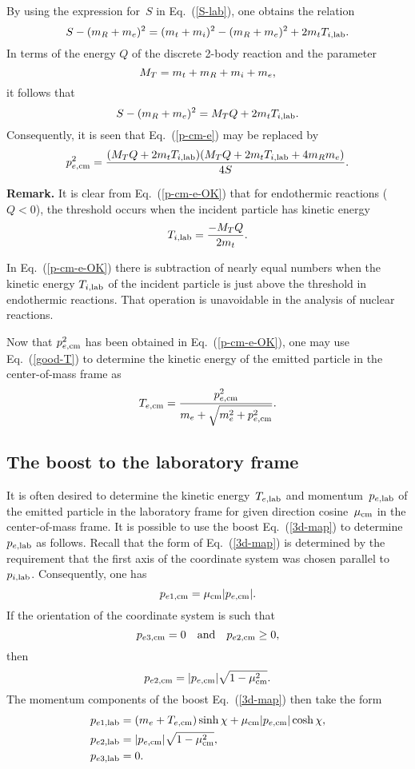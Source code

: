 {By using the expression for~$S$ in Eq.~(\ref{S-lab}), one
obtains the relation
$$
  S - (m_R + m_e)^2 =
  (m_t + m_i)^2 - (m_R + m_e)^2  + 2m_t T_{i,\textrm{lab}}.
$$
In terms of the energy $Q$ of the discrete 2-body reaction
and the parameter
\begin{equation}
  M_T = m_t + m_R + m_i + m_e,
 \label{def-M}
\end{equation}
it follows that
$$
    S - (m_R + m_e)^2 =
     M_T Q + 2m_t T_{i,\textrm{lab}}.
$$
Consequently, it is seen that Eq.~(\ref{p-cm-e}) may be
replaced by
\begin{equation}
  p_{e,\textrm{cm}}^2 = \frac{ (M_T Q +  2m_t T_{i,\textrm{lab}} )
                 ( M_T Q +  2m_t T_{i,\textrm{lab}} + 4m_R m_e)}
                {4 S }.
  \label{p-cm-e-OK}
\end{equation}

\textbf{Remark.}
It is clear from Eq.~(\ref{p-cm-e-OK}) that for endothermic
reactions ($Q < 0$), the threshold occurs when the incident
particle has kinetic energy
$$
  T_{i,\textrm{lab}} = \frac{-M_T Q}{2m_t}.
$$

In Eq.~(\ref{p-cm-e-OK}) there is subtraction of nearly equal
numbers when the kinetic energy $T_{i,\textrm{lab}}$ of the incident
particle is just above the threshold in endothermic reactions.
That operation is unavoidable in
the analysis of nuclear reactions. 

Now that $p_{e,\textrm{cm}}^2$ has been obtained in Eq.~(\ref{p-cm-e-OK}), one may use
Eq.~(\ref{good-T}) to determine the kinetic energy of the
emitted particle in the center-of-mass frame as
\begin{equation}
  T_{e,\textrm{cm}} = \frac{p_{e,\textrm{cm}}^2 }
          {m_e + \sqrt{ m_e^2 + p_{e,\textrm{cm}}^2 }}.
 \label{T-cm-e}
\end{equation}

\subsection{The boost to the laboratory frame}
It is often desired to determine the kinetic energy~$T_{e,\textrm{lab}}$
and momentum~$p_{e,\textrm{lab}}$ of the emitted particle in the laboratory frame
for given direction cosine~$\mu_{\text{cm}}$ in the center-of-mass frame.
It is possible to use the boost 
Eq.~(\ref{3d-map}) to determine $p_{e,\textrm{lab}}$ as follows.  Recall that
the form of Eq.~(\ref{3d-map}) is determined by the requirement that
the first axis of the coordinate system was chosen parallel to~$p_{i,\textrm{lab}}$.
Consequently, one has
$$
  p_{e1,\textrm{cm}} = \mu_{\text{cm}} |p_{e,\textrm{cm}}|.
$$
If the orientation of the coordinate system is such that
$$
  p_{e3,\textrm{cm}} = 0
  \quad \textrm{and} \quad
  p_{e2,\textrm{cm}} \ge 0,
$$
then
$$
  p_{e2,\textrm{cm}} =  |p_{e,\textrm{cm}}| \sqrt{ 1 - \mu_{\text{cm}}^2}.
$$
The momentum components of the boost Eq.~(\ref{3d-map}) then
take the form
\begin{equation*}
\begin{split}
  p_{e1,\textrm{lab}} &= (m_e + T_{e,\textrm{cm}})\sinh \chi +  \mu_{\text{cm}} |p_{e,\textrm{cm}}| \cosh \chi, \\
  p_{e2,\textrm{lab}} &= |p_{e,\textrm{cm}}| \sqrt{ 1 - \mu_{\text{cm}}^2}, \\
  p_{e3,\textrm{lab}} & = 0.\\
\end{split}
\end{equation*}

}
